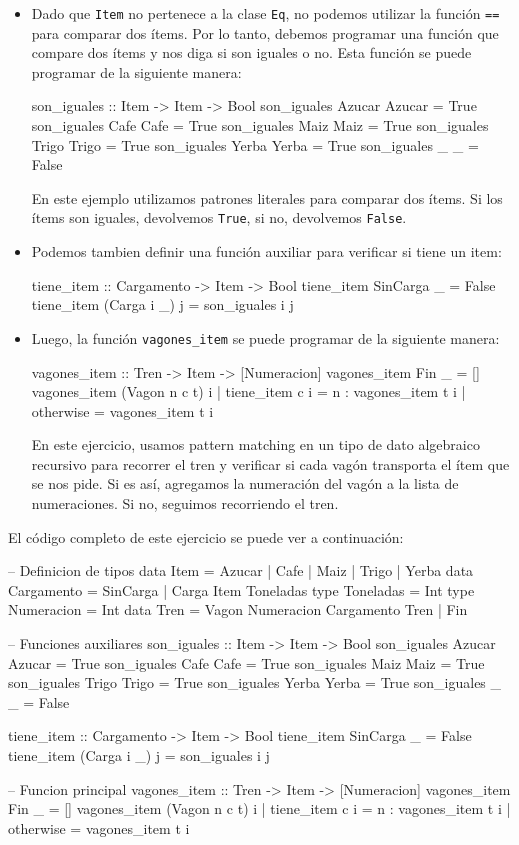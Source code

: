 \documentclass{article}
\begin{document}
\begin{itemize}
    \item Dado que \texttt{Item} no pertenece a la clase \texttt{Eq}, no podemos utilizar la función \texttt{==} para comparar dos ítems. Por lo tanto, debemos programar una función que compare dos ítems y nos diga si son iguales o no. Esta función se puede programar de la siguiente manera:
    \begin{haskell}
    son_iguales :: Item -> Item -> Bool
    son_iguales Azucar Azucar = True
    son_iguales Cafe Cafe = True
    son_iguales Maiz Maiz = True
    son_iguales Trigo Trigo = True
    son_iguales Yerba Yerba = True
    son_iguales _ _ = False
    \end{haskell}
    En este ejemplo utilizamos patrones literales para comparar dos ítems. Si los ítems son iguales, devolvemos \texttt{True}, si no, devolvemos \texttt{False}.
    \item Podemos tambien definir una función auxiliar para verificar si tiene un item:
    \begin{haskell}
    tiene_item :: Cargamento -> Item -> Bool
    tiene_item SinCarga _ = False
    tiene_item (Carga i _) j = son_iguales i j
    \end{haskell}
    \item Luego, la función \texttt{vagones\_item} se puede programar de la siguiente manera:
    \begin{haskell}
    vagones_item :: Tren -> Item -> [Numeracion]
    vagones_item Fin _ = []
    vagones_item (Vagon n c t) i
        | tiene_item c i = n : vagones_item t i
        | otherwise = vagones_item t i
    \end{haskell}
    En este ejercicio, usamos pattern matching en un tipo de dato algebraico recursivo para recorrer el tren y verificar si cada vagón transporta el ítem que se nos pide. Si es así, agregamos la numeración del vagón a la lista de numeraciones. Si no, seguimos recorriendo el tren.
\end{itemize}
El código completo de este ejercicio se puede ver a continuación:
\begin{haskell}
-- Definicion de tipos
data Item = Azucar | Cafe | Maiz | Trigo | Yerba
data Cargamento = SinCarga | Carga Item Toneladas
type Toneladas = Int
type Numeracion = Int
data Tren = Vagon Numeracion Cargamento Tren | Fin

-- Funciones auxiliares
son_iguales :: Item -> Item -> Bool
son_iguales Azucar Azucar = True
son_iguales Cafe Cafe = True
son_iguales Maiz Maiz = True
son_iguales Trigo Trigo = True
son_iguales Yerba Yerba = True
son_iguales _ _ = False

tiene_item :: Cargamento -> Item -> Bool
tiene_item SinCarga _ = False
tiene_item (Carga i _) j = son_iguales i j

-- Funcion principal
vagones_item :: Tren -> Item -> [Numeracion]
vagones_item Fin _ = []
vagones_item (Vagon n c t) i
    | tiene_item c i = n : vagones_item t i
    | otherwise = vagones_item t i
\end{haskell}
\end{document}
